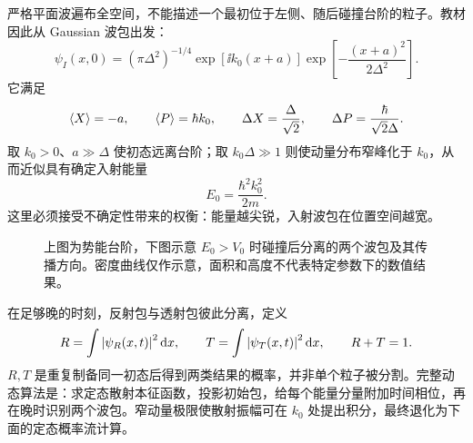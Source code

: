 严格平面波遍布全空间，不能描述一个最初位于左侧、随后碰撞台阶的粒子。教材因此从 Gaussian 波包出发：
\begin{equation}
  \psi_I(x,0)
  =(\pi\Delta^2)^{-1/4}
  \exp[\ii k_0(x+a)]
  \exp\left[-\frac{(x+a)^2}{2\Delta^2}\right].
  \label{eq:QM-C05-S04-incident-gaussian}
\end{equation}
它满足
\begin{equation}
  \left\langle X \right\rangle=-a,
  \qquad
  \left\langle P \right\rangle=\hbar k_0,
  \qquad
  \Delta X=\frac{\Delta}{\sqrt2},
  \qquad
  \Delta P=\frac{\hbar}{\sqrt2\Delta}.
  \label{eq:QM-C05-S04-gaussian-data}
\end{equation}
取 $k_0>0$、$a\gg\Delta$ 使初态远离台阶；取 $k_0\Delta\gg1$ 则使动量分布窄峰化于 $k_0$，从而近似具有确定入射能量
\begin{equation}
  E_0=\frac{\hbar^2k_0^2}{2m}.
  \label{eq:QM-C05-S04-incident-energy}
\end{equation}
这里必须接受不确定性带来的权衡：能量越尖锐，入射波包在位置空间越宽。

\begin{figure}[htbp]
  \centering
  \caption{上图为势能台阶，下图示意 $E_0>V_0$ 时碰撞后分离的两个波包及其传播方向。密度曲线仅作示意，面积和高度不代表特定参数下的数值结果。}
  \label{fig:QM-C05-S04-packet-scattering}
\end{figure}

在足够晚的时刻，反射包与透射包彼此分离，定义
\begin{equation}
  R=\int\left|\psi_R(x,t)\right|^2\mathop{}\!\mathrm{d} x,
  \qquad
  T=\int\left|\psi_T(x,t)\right|^2\mathop{}\!\mathrm{d} x,
  \qquad
  R+T=1.
  \label{eq:QM-C05-S04-packet-RT}
\end{equation}
$R,T$ 是重复制备同一初态后得到两类结果的概率，并非单个粒子被分割。完整动态算法是：求定态散射本征函数，投影初始包，给每个能量分量附加时间相位，再在晚时识别两个波包。窄动量极限使散射振幅可在 $k_0$ 处提出积分，最终退化为下面的定态概率流计算。

